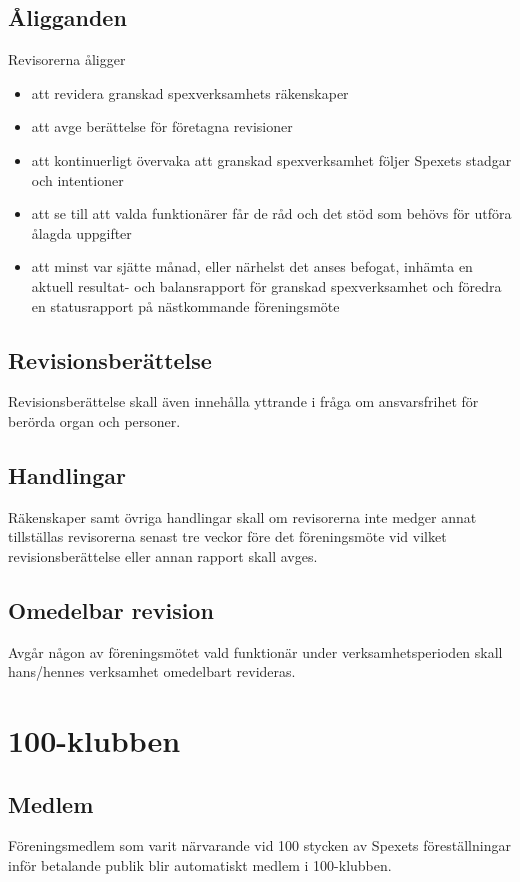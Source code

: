 \documentclass[a4paper]{article}
\begin{document}
\subsection{Åligganden}
Revisorerna åligger

\begin{itemize}
  \item att revidera granskad spexverksamhets räkenskaper
  \item att avge berättelse för företagna revisioner
  \item att kontinuerligt övervaka att granskad spexverksamhet följer Spexets stadgar och intentioner
  \item att se till att valda funktionärer får de råd och det stöd som behövs för utföra ålagda uppgifter
  \item att minst var sjätte månad, eller närhelst det anses befogat, inhämta en aktuell resultat- och balansrapport för granskad spexverksamhet och föredra en statusrapport på nästkommande föreningsmöte
\end{itemize}

\subsection{Revisionsberättelse}
Revisionsberättelse skall även innehålla yttrande i fråga om ansvarsfrihet för berörda organ och personer.

\subsection{Handlingar}
Räkenskaper samt övriga handlingar skall om revisorerna inte medger annat tillställas revisorerna senast tre veckor före det föreningsmöte vid vilket revisionsberättelse eller annan rapport skall avges.

\subsection{Omedelbar revision}
Avgår någon av föreningsmötet vald funktionär under verksamhetsperioden skall hans/hennes verksamhet omedelbart revideras.

\section{100-klubben}
\label{section:100-klubben}

\subsection{Medlem}
Föreningsmedlem som varit närvarande vid 100 stycken av Spexets föreställningar inför betalande publik blir automatiskt medlem i 100-klubben.
\end{document}
